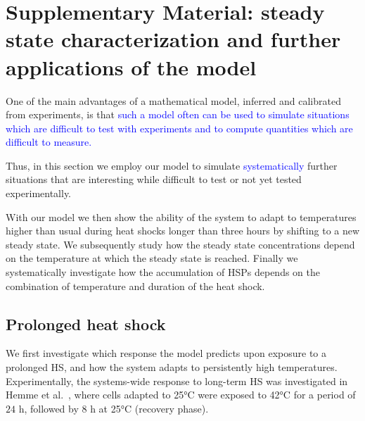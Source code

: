 \documentclass[oneside, 10pt, a4paper, twocolumn]{article}
\begin{document}
\clearpage





\section{Supplementary Material: steady state characterization and further applications of the model}
\label{SectionFurtherPredictions}

One of the main advantages of a mathematical model, inferred and calibrated from experiments, is that \textcolor{blue}{such a model often can be used to simulate situations which are difficult to test with experiments and to compute quantities which are difficult to measure.}

Thus, in this section we employ our model to simulate \textcolor{blue}{systematically} further situations that are interesting while difficult to test or not yet tested experimentally. 

With our model we then show the ability of the system to adapt to temperatures higher than usual during heat shocks longer than three hours by shifting to a new steady state. 
We subsequently study how the steady state concentrations depend on the temperature at which the steady state is reached. 
Finally we systematically investigate how the accumulation of HSPs depends on the combination of temperature and duration of the heat shock. 





\subsection{Prolonged heat shock}
\label{SecAcclimation}

We first investigate which response the model predicts upon exposure to a prolonged HS, and how
the system adapts to persistently high temperatures.
Experimentally, the systems-wide response to long-term HS was investigated in Hemme et al.~\cite{Hemme2014},
where cells adapted to 25°C were exposed to 42°C for a period of $24$ h, followed by $8$ h at 25°C (recovery phase).

\end{document}

